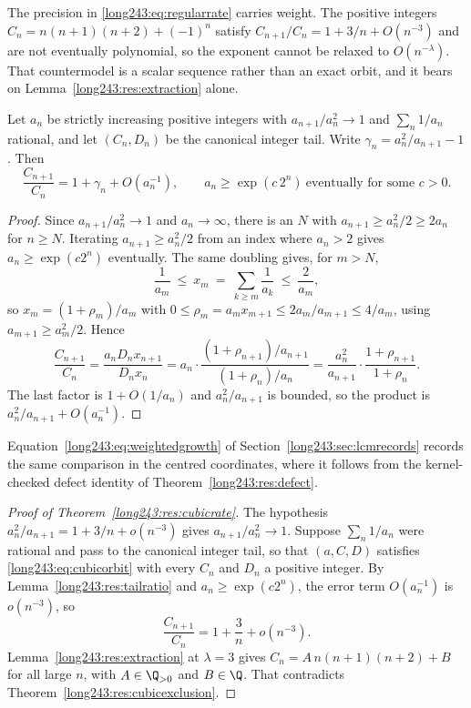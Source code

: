 The precision in \eqref{long243:eq:regularrate} carries weight.  The positive integers
$C_n=n(n+1)(n+2)+(-1)^n$ satisfy $C_{n+1}/C_n=1+3/n+O(n^{-3})$ and are not
eventually polynomial, so the exponent cannot be relaxed to $O(n^{-\lambda})$.
That countermodel is a scalar sequence rather than an exact orbit, and it bears
on Lemma~\ref{long243:res:extraction} alone.

\begin{lemma}\label{long243:res:tailratio}
Let $a_n$ be strictly increasing positive integers with $a_{n+1}/a_n^2\to1$ and
$\sum_n1/a_n$ rational, and let $(C_n,D_n)$ be the canonical integer tail.
Write $\gamma_n=a_n^2/a_{n+1}-1$.  Then
\[
 \frac{C_{n+1}}{C_n}=1+\gamma_n+O(a_n^{-1}),
 \qquad a_n\ge\exp(c\,2^n)\ \text{eventually for some }c>0 .
\]
\end{lemma}

\begin{proof}
Since $a_{n+1}/a_n^2\to1$ and $a_n\to\infty$, there is an $N$ with
$a_{n+1}\ge a_n^2/2\ge2a_n$ for $n\ge N$.  Iterating $a_{n+1}\ge a_n^2/2$ from
an index where $a_n>2$ gives $a_n\ge\exp(c2^n)$ eventually.  The same doubling
gives, for $m>N$,
\[
 \frac1{a_m}\ \le\ x_m\ =\ \sum_{k\ge m}\frac1{a_k}\ \le\ \frac2{a_m},
\]
so $x_{m}=(1+\rho_{m})/a_{m}$ with
$0\le\rho_{m}=a_mx_{m+1}\le 2a_m/a_{m+1}\le4/a_m$, using
$a_{m+1}\ge a_m^2/2$.  Hence
\[
 \frac{C_{n+1}}{C_n}=\frac{a_nD_nx_{n+1}}{D_nx_n}
 =a_n\cdot\frac{(1+\rho_{n+1})/a_{n+1}}{(1+\rho_n)/a_n}
 =\frac{a_n^2}{a_{n+1}}\cdot\frac{1+\rho_{n+1}}{1+\rho_n}.
\]
The last factor is $1+O(1/a_n)$ and $a_n^2/a_{n+1}$ is bounded, so the product
is $a_n^2/a_{n+1}+O(a_n^{-1})$.
\end{proof}

\noindent Equation~\eqref{long243:eq:weightedgrowth} of Section~\ref{long243:sec:lcmrecords}
records the same comparison in the centred coordinates, where it follows from
the kernel-checked defect identity of Theorem~\ref{long243:res:defect}.

\begin{proof}[Proof of Theorem~\ref{long243:res:cubicrate}]
The hypothesis $a_n^2/a_{n+1}=1+3/n+o(n^{-3})$ gives $a_{n+1}/a_n^2\to1$.
Suppose $\sum_n1/a_n$ were rational and pass to the canonical integer tail, so
that $(a,C,D)$ satisfies \eqref{long243:eq:cubicorbit} with every $C_n$ and $D_n$ a
positive integer.  By Lemma~\ref{long243:res:tailratio} and $a_n\ge\exp(c2^n)$, the
error term $O(a_n^{-1})$ is $o(n^{-3})$, so
\[
 \frac{C_{n+1}}{C_n}=1+\frac3n+o(n^{-3}).
\]
Lemma~\ref{long243:res:extraction} at $\lambda=3$ gives
$C_n=A\,n(n+1)(n+2)+B$ for all large $n$, with $A\in\Q_{>0}$ and $B\in\Q$.
That contradicts Theorem~\ref{long243:res:cubicexclusion}.
\end{proof}

